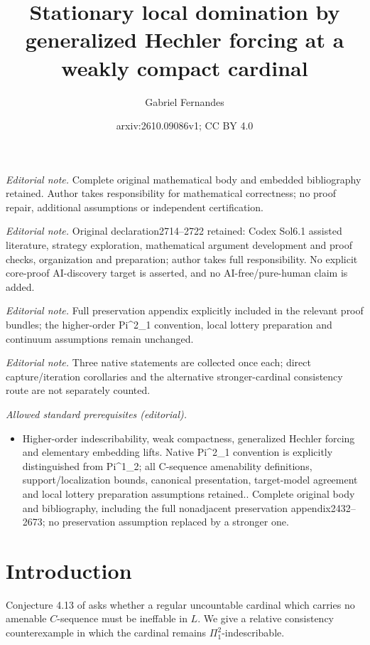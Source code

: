 \documentclass[10pt,a4paper]{amsart}
\title{Stationary local domination by generalized Hechler forcing at a weakly compact cardinal}
\author{Gabriel Fernandes}
\date{arxiv:2610.09086v1; CC BY 4.0}
\theoremstyle{definition}
\theoremstyle{remark}
\begin{document}
\maketitle
\noindent\textit{Editorial note.} Complete original mathematical body and embedded bibliography retained. Author takes responsibility for mathematical correctness; no proof repair, additional assumptions or independent certification.\par\medskip
\noindent\textit{Editorial note.} Original declaration2714--2722 retained: Codex Sol6.1 assisted literature, strategy exploration, mathematical argument development and proof checks, organization and preparation; author takes full responsibility. No explicit core-proof AI-discovery target is asserted, and no AI-free/pure-human claim is added.\par\medskip
\noindent\textit{Editorial note.} Full preservation appendix explicitly included in the relevant proof bundles; the higher-order Pi\textasciicircum{}2\_1 convention, local lottery preparation and continuum assumptions remain unchanged.\par\medskip
\noindent\textit{Editorial note.} Three native statements are collected once each; direct capture/iteration corollaries and the alternative stronger-cardinal consistency route are not separately counted.\par\medskip
\noindent\textit{Allowed standard prerequisites (editorial).}\begin{itemize}
\item Higher-order indescribability, weak compactness, generalized Hechler forcing and elementary embedding lifts. Native Pi\textasciicircum{}2\_1 convention is explicitly distinguished from Pi\textasciicircum{}1\_2; all C-sequence amenability definitions, support/localization bounds, canonical presentation, target-model agreement and local lottery preparation assumptions retained.. Complete original body and bibliography, including the full nonadjacent preservation appendix2432--2673; no preservation assumption replaced by a stronger one.
\end{itemize}\medskip
\section{Introduction}\label{sec:introduction}

Conjecture 4.13 of \cite{IR} asks whether a regular uncountable
cardinal which carries no amenable \(C\)-sequence must be
ineffable in \(L\). We give a relative consistency
counterexample in which the cardinal remains
\(\Pi^2_1\)-indescribable. 
\end{document}

